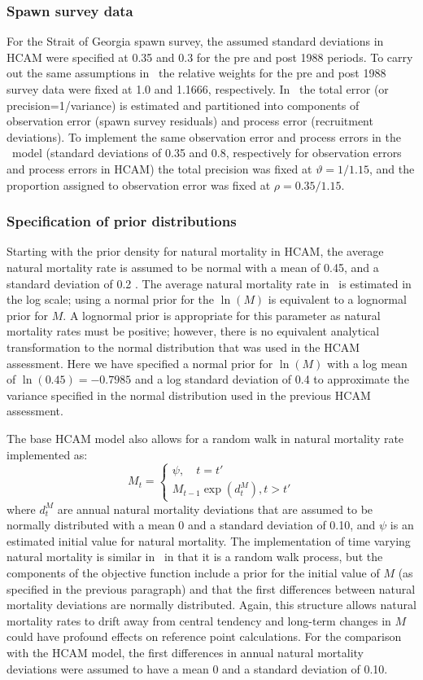 \subsubsection{Spawn survey data}
 	For the Strait of Georgia spawn survey, the assumed standard deviations in HCAM were specified at 0.35 and 0.3 for the pre and post 1988 periods.  To carry out the same assumptions in \iscam\ the relative weights for the pre and post 1988 survey data were fixed at 1.0 and 1.1666, respectively.  In \iscam\ the total error (or precision=1/variance) is estimated and partitioned into components of observation error (spawn survey residuals) and process error (recruitment deviations).  To implement the same observation error and process errors in the \iscam\ model (standard deviations of 0.35 and 0.8, respectively for observation errors and process errors in HCAM) the total precision was fixed at $\vartheta=1/1.15$, and the proportion assigned to observation error was fixed at $\rho = 0.35/1.15$.

\subsubsection{Specification of prior distributions}
	Starting with the prior density for natural mortality in HCAM, the average natural mortality rate is assumed to be normal with a mean of 0.45, and a standard deviation of 0.2 \citep[see Table 3 in][]{Clear2010}.  The average natural mortality rate in \iscam\ is estimated in the log scale; using a normal prior for the $\ln(M)$ is equivalent to a lognormal prior for $M$.  A lognormal prior is appropriate for this parameter as natural mortality rates must be positive; however, there is no equivalent analytical transformation to the normal distribution that was used in the HCAM assessment.  Here we have specified a  normal prior for $\ln(M)$ with a log mean of $\ln(0.45)=-0.7985$ and a log standard deviation of 0.4 to approximate the variance specified in the normal distribution used in the previous HCAM assessment.
	
	The base HCAM model also allows for a random walk in natural mortality rate implemented as:
\[
M_t =\begin{cases}
	 \psi, \quad t=t'\\
	 M_{t-1}\exp(d_t^M), t>t'
	 \end{cases}
\]
where $d_t^M$ are annual natural mortality deviations that are assumed to be normally distributed with a mean 0 and a standard deviation of 0.10, and $\psi$ is an estimated initial value for natural mortality.  The implementation of time varying natural mortality is similar in \iscam\ in that it is a random walk process, but the components of the objective function include a prior for the initial value of $M$ (as specified in the previous paragraph) and that the first differences between natural mortality deviations are normally distributed. Again, this structure allows natural mortality rates to drift away from central tendency and long-term changes in $M$ could have profound effects on reference point calculations.  For the comparison with the HCAM model, the first differences in annual natural mortality deviations were assumed to have a mean 0 and a standard deviation of 0.10.

